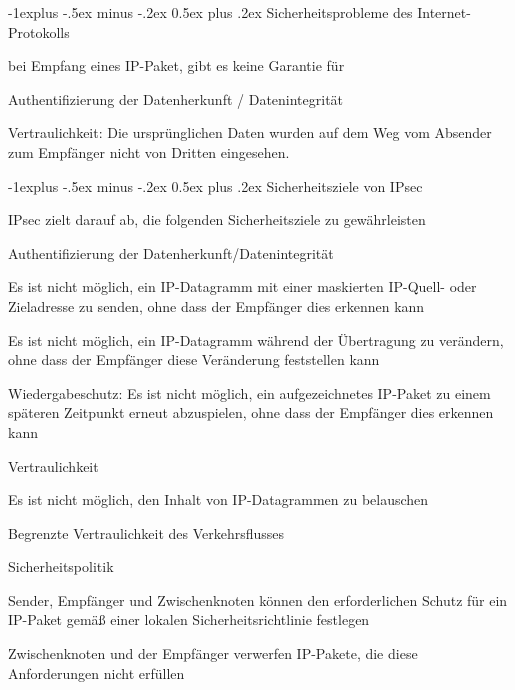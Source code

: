 \documentclass[a4paper]{article}
\makeatletter
\renewcommand{\subsection}{\@startsection{subsection}{2}{0mm}%
 {-1explus -.5ex minus -.2ex}%
 {0.5ex plus .2ex}%
 {\normalfont\normalsize\bfseries}}
\makeatother
\begin{document}
\begin{multicols}{3}
      \subsection{Sicherheitsprobleme des Internet-Protokolls}
      \begin{itemize*}
            \item bei Empfang eines IP-Paket, gibt es keine Garantie für
            \item Authentifizierung der Datenherkunft / Datenintegrität
            \item Vertraulichkeit: Die ursprünglichen Daten wurden auf dem Weg vom Absender zum Empfänger nicht von Dritten eingesehen.
      \end{itemize*}

      \subsection{Sicherheitsziele von IPsec}
      \begin{itemize*}
            \item IPsec zielt darauf ab, die folgenden Sicherheitsziele zu gewährleisten
            \item Authentifizierung der Datenherkunft/Datenintegrität
            \begin{itemize*}
                  \item Es ist nicht möglich, ein IP-Datagramm mit einer maskierten IP-Quell- oder Zieladresse zu senden, ohne dass der Empfänger dies erkennen kann
                  \item Es ist nicht möglich, ein IP-Datagramm während der Übertragung zu verändern, ohne dass der Empfänger diese Veränderung feststellen kann
                  \item Wiedergabeschutz: Es ist nicht möglich, ein aufgezeichnetes IP-Paket zu einem späteren Zeitpunkt erneut abzuspielen, ohne dass der Empfänger dies erkennen kann
            \end{itemize*}
            \item Vertraulichkeit
            \begin{itemize*}
                  \item Es ist nicht möglich, den Inhalt von IP-Datagrammen zu belauschen
                  \item Begrenzte Vertraulichkeit des Verkehrsflusses
            \end{itemize*}
            \item Sicherheitspolitik
            \begin{itemize*}
                  \item Sender, Empfänger und Zwischenknoten können den erforderlichen Schutz für ein IP-Paket gemäß einer lokalen Sicherheitsrichtlinie festlegen
                  \item Zwischenknoten und der Empfänger verwerfen IP-Pakete, die diese Anforderungen nicht erfüllen
            \end{itemize*}
      \end{itemize*}


\end{multicols}
\end{document}
